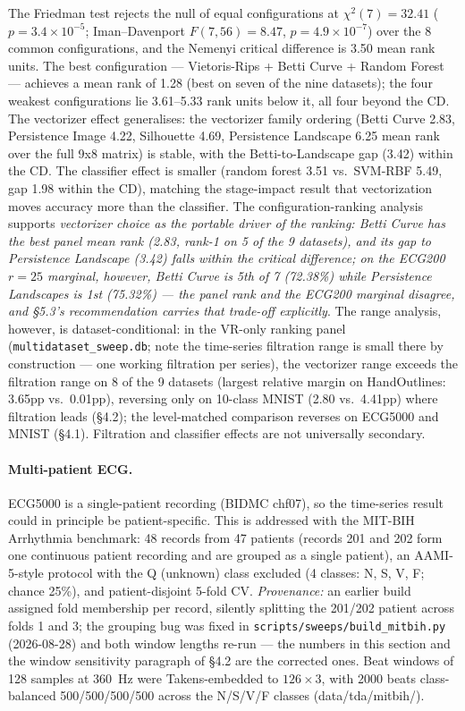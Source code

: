 \documentclass[12pt, a4paper]{report}
\theoremstyle{definition}
\theoremstyle{plain}
\theoremstyle{remark}
\begin{document}
The Friedman test rejects the null of equal configurations at
$\chi^2(7) = 32.41$ ($p = 3.4\times10^{-5}$; Iman--Davenport
$F(7,56) = 8.47$, $p = 4.9\times10^{-7}$) over the 8 common
configurations, and the Nemenyi critical difference is 3.50 mean
rank units. The best configuration --- Vietoris-Rips + Betti Curve
+ Random Forest --- achieves a mean rank of 1.28 (best on seven of
the nine datasets); the four weakest configurations lie 3.61--5.33 rank
units below it, all four beyond the CD. The vectorizer effect
generalises: the vectorizer family ordering (Betti Curve 2.83,
Persistence Image 4.22, Silhouette 4.69, Persistence Landscape 6.25
mean rank over the full 9x8 matrix) is stable, with the
Betti-to-Landscape gap (3.42) within the CD. The classifier effect is smaller (random forest 3.51 vs.\ SVM-RBF 5.49, gap 1.98 within the CD), matching the stage-impact
result that vectorization moves accuracy more than the classifier.
The configuration-ranking analysis supports \emph{vectorizer
choice as the portable driver of the ranking: Betti Curve has the
best panel mean rank (2.83, rank-1 on 5 of the 9 datasets), and its
gap to Persistence Landscape (3.42) falls within the critical
difference; on the ECG200 $r{=}25$ marginal, however, Betti Curve is
5th of 7 (72.38\%) while Persistence Landscapes is 1st (75.32\%) ---
the panel rank and the ECG200 marginal disagree, and \S5.3's
recommendation carries that trade-off explicitly}. The range
analysis, however, is
dataset-conditional: in the VR-only ranking panel
(\texttt{multidataset\_sweep.db}; note the time-series filtration
range is small there by construction --- one working filtration per
series), the vectorizer range exceeds the filtration range on 8 of
the 9 datasets (largest relative margin on HandOutlines: 3.65pp vs.\
0.01pp), reversing only on 10-class MNIST (2.80 vs.\ 4.41pp) where
filtration leads (\S4.2); the level-matched comparison
reverses on ECG5000 and MNIST (\S4.1). Filtration and classifier
effects are not universally secondary.

\paragraph{Multi-patient ECG.} ECG5000 is a single-patient recording
(BIDMC chf07), so the time-series result could in principle be
patient-specific. This is addressed with the MIT-BIH Arrhythmia
benchmark: 48 records from 47 patients (records 201 and 202 form one
continuous patient recording and are grouped as a single patient), an AAMI-5-style protocol
with the Q (unknown) class excluded (4 classes: N, S, V, F; chance
25\%), and patient-disjoint 5-fold CV. \emph{Provenance:} an earlier
build assigned fold membership per record, silently splitting the
201/202 patient across folds 1 and 3; the grouping bug was fixed in
\texttt{scripts/sweeps/build\_mitbih.py} (2026-08-28) and both window
lengths re-run --- the numbers in this section and the window
sensitivity paragraph of \S4.2 are the corrected ones. Beat windows of 128 samples at 360~Hz were
Takens-embedded to $126 \times 3$, with 2000 beats class-balanced
500/500/500/500 across the N/S/V/F classes (data/tda/mitbih/).
\end{document}
